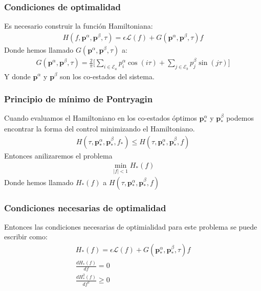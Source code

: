 \begin{frame}
    \frametitle{Condiciones de optimalidad}

    Es necesario construir la función Hamiltoniana:
    \begin{gather}\label{hamil}
        H(f,\bm{p}^\alpha,\bm{p}^\beta,\tau) = \epsilon \mathcal{L}(f) + 
        G(\bm{p}^\alpha,\bm{p}^\beta,\tau) f
    \end{gather}
    Donde  hemos llamado $G(\bm{p}^\alpha,\bm{p}^\beta,\tau)$ a:
    \begin{gather}
        G(\bm{p}^\alpha,\bm{p}^\beta,\tau) = \frac{2}{\pi} \Bigg[ 
            \sum_{i \in \mathcal{E}_a} p^\alpha_i \cos(i\tau)+ 
            \sum_{j \in \mathcal{E}_b} p^\beta_j \sin(j\tau) 
        \Bigg]
    \end{gather}
    Y donde $\bm{p}^\alpha$ y $\bm{p}^\beta$ son los co-estados del sistema.
\end{frame}


\begin{frame}
    \frametitle{Principio de mínimo de Pontryagin}
    Cuando evaluamos el Hamiltoniano en los co-estados óptimos $\bm{p}_*^\alpha$ y $\bm{p}_*^\beta$ podemos encontrar la forma del control minimizando el Hamiltoniano.
    \begin{gather}\label{minH}
        H(\tau,\bm{p}_*^\alpha,\bm{p}^\beta_*,f_*) \leq
        H(\tau,\bm{p}_*^\alpha,\bm{p}^\beta_*,f)
    \end{gather}
    Entonces anilizaremos el problema 
    \begin{gather}
        \min_{|f|<1} H_*(f)
    \end{gather}
    Donde hemos llamado $H_*(f)$ a $H(\tau,\bm{p}_*^\alpha,\bm{p}^\beta_*,f)$
\end{frame}


\begin{frame}
    \frametitle{Condiciones necesarias de optimalidad}
    Entonces las condiciones necesarias de optimialidad para este problema se puede escribir como:
    \begin{gather}\label{hamil}
        H_*(f) = \epsilon \mathcal{L}(f) + 
        G(\bm{p}^\alpha_*,\bm{p}^\beta_*,\tau) f \\
        \frac{dH_*(f)}{df} = 0 \\
        \frac{dH_*^2(f)}{df^2} \geq 0 
    \end{gather}

\end{frame}

